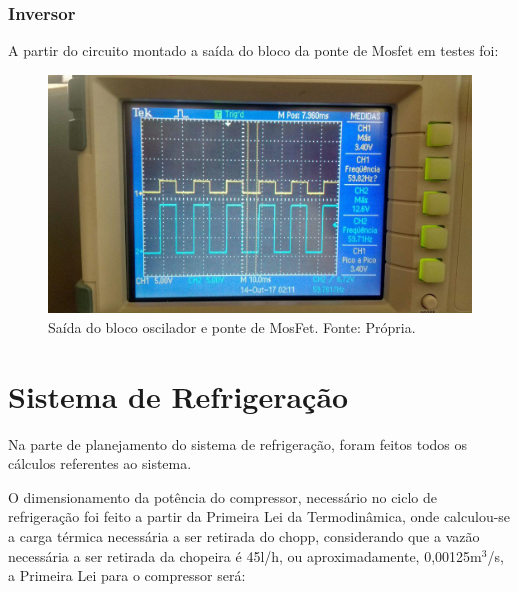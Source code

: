             \subsubsection[Inversor]{Inversor}
            
            	A partir do circuito montado a saída do bloco da ponte de Mosfet em testes foi:
            	
                \begin{figure}[!htb]
            		\centering
            		\includegraphics[scale= 0.2]{figuras/saida_inversor.jpg}
            		\caption{Saída do bloco oscilador e ponte de MosFet. Fonte: Própria.}
            		\label{saida-inversor}
            	\end{figure}    
    
 
 
          	
             	
            	
            	
            	         
            	
 	
            	

				
				 	         		
		
        \section[Sistema de Refrigeração]{Sistema de Refrigeração}

            Na parte de planejamento do sistema de refrigeração, foram feitos todos os
            cálculos referentes ao sistema. 

            O dimensionamento da potência do compressor, necessário no ciclo de
            refrigeração foi feito a partir da Primeira Lei da Termodinâmica, onde calculou-se a
            carga térmica necessária a ser retirada do chopp, considerando que a vazão
            necessária a ser retirada da chopeira é 45l/h, ou aproximadamente, 0,00125m$^3$/s, a
            Primeira Lei para o compressor será:
            
